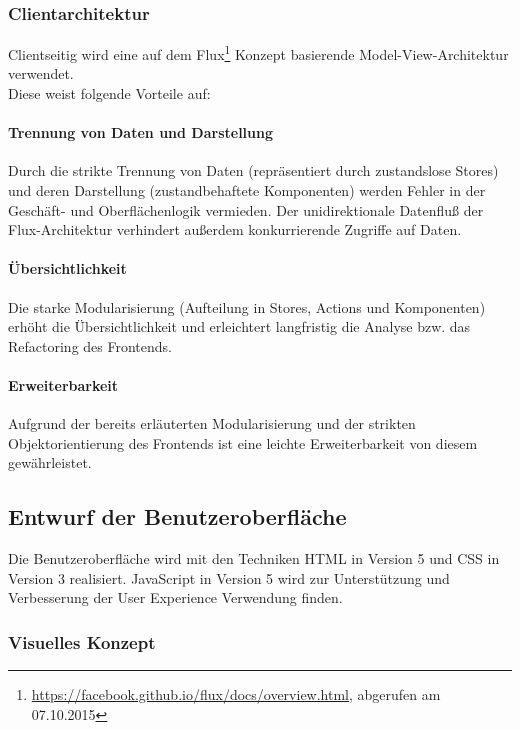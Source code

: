 \documentclass[12pt, xcolor=dvipsnames]{scrartcl}
\begin{document}
\subsubsection{Clientarchitektur}

Clientseitig wird eine auf dem
Flux\footnote{\url{https://facebook.github.io/flux/docs/overview.html}, abgerufen am 07.10.2015} Konzept basierende Model-View-Architektur verwendet. \\

Diese weist folgende Vorteile auf:

\paragraph{Trennung von Daten und Darstellung}
Durch die strikte Trennung von Daten (repräsentiert durch zustandslose Stores) und deren Darstellung (zustandbehaftete Komponenten) werden Fehler in der Geschäft- und Oberflächenlogik vermieden. Der unidirektionale Datenfluß der Flux-Architektur verhindert außerdem konkurrierende Zugriffe auf Daten.

\paragraph{Übersichtlichkeit}
Die starke Modularisierung (Aufteilung in Stores, Actions und Komponenten) erhöht die Übersichtlichkeit und erleichtert langfristig die Analyse bzw. das Refactoring des Frontends.

\paragraph{Erweiterbarkeit}
Aufgrund der bereits erläuterten Modularisierung und der strikten Objektorientierung des Frontends ist eine leichte Erweiterbarkeit von diesem gewährleistet.

\subsection{Entwurf der Benutzeroberfläche}

Die Benutzeroberfläche wird mit den Techniken HTML in Version 5 und CSS in Version 3 realisiert. JavaScript in Version 5 wird zur Unterstützung und Verbesserung der User Experience Verwendung finden.

\subsubsection{Visuelles Konzept}
\end{document}
